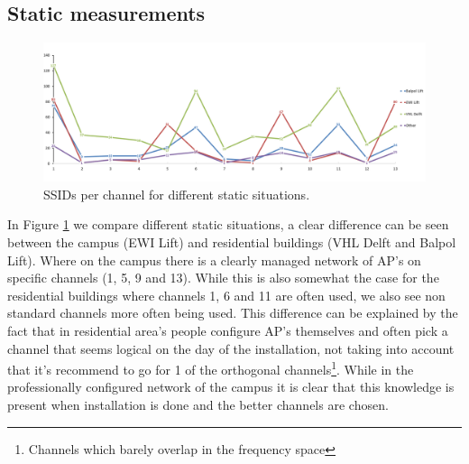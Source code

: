 \documentclass[11pt,a4paper]{article}
\begin{document}
\subsection{Static measurements}
\begin{figure}[h!]
\centering
\includegraphics[scale=0.3]{static_per_channel_graph3.png}
\caption{SSIDs per channel for different static situations.}
\label{fig:static_per_channel_graph}
\end{figure}
In Figure \ref{fig:static_per_channel_graph} we compare different static situations, a clear difference can be seen between the campus (EWI Lift) and residential buildings (VHL Delft and Balpol Lift).
Where on the campus there is a clearly managed network of AP's on specific channels (1, 5, 9 and 13). While this is also somewhat the case for the residential buildings where channels 1, 6 and 11 are often used, we also see non standard channels more often being used. This difference can be explained by the fact that in residential area's people configure AP's themselves and often pick a channel that seems logical on the day of the installation, not taking into account that it's recommend to go for 1 of the orthogonal channels\footnote{Channels which barely overlap in the frequency space}. While in the professionally configured network of the campus it is clear that this knowledge is present when installation is done and the better channels are chosen.
\end{document}
